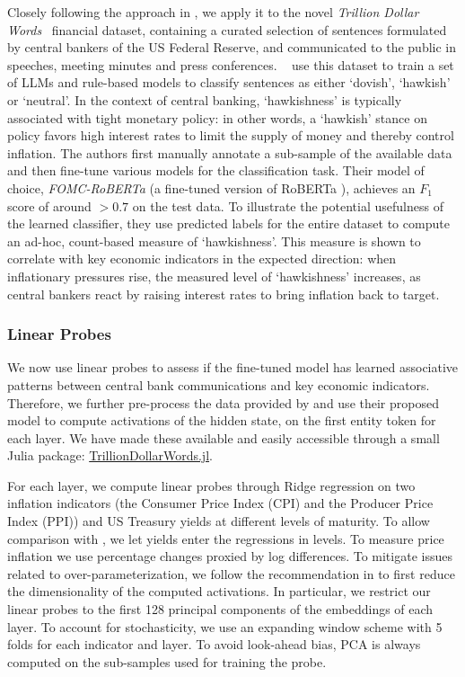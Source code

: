 \documentclass{article}
\theoremstyle{plain}
\theoremstyle{definition}
\theoremstyle{remark}
\begin{document}
Closely following the approach in \citet{gurnee2023languagev2}, we apply it to the novel \emph{Trillion Dollar Words}~\cite{shah2023trillion} financial dataset, containing a curated selection of sentences formulated by central bankers of the US Federal Reserve, and communicated to the public in speeches, meeting minutes and press conferences. ~\cite{shah2023trillion} use this dataset to train a set of LLMs and rule-based models to classify sentences as either `dovish', `hawkish' or `neutral'. In the context of central banking, `hawkishness' is typically associated with tight monetary policy: in other words, a `hawkish' stance on policy favors high interest rates to limit the supply of money and thereby control inflation. The authors first manually annotate a sub-sample of the available data and then fine-tune various models for the classification task. Their model of choice, \emph{FOMC-RoBERTa} (a fine-tuned version of RoBERTa \citep{liu2019roberta}), achieves an \(F_1\) score of around \(>0.7\) on the test data. To illustrate the potential usefulness of the learned classifier, they use predicted labels for the entire dataset to compute an ad-hoc, count-based measure of `hawkishness'. This measure is shown to correlate with key economic indicators in the expected direction: when inflationary pressures rise, the measured level of `hawkishness' increases, as central bankers react by raising interest rates to bring inflation back to target.

\subsubsection{Linear Probes}\label{linear-probes}
We now use linear probes to assess if the fine-tuned model has learned associative patterns between central bank communications and key economic indicators. Therefore, we further pre-process the data provided by \citet{shah2023trillion} and use their proposed model to compute activations of the hidden state, on the first entity token for each layer. We have made these available and easily accessible through a small Julia package: \href{https://anonymous.4open.science/r/TrillionDollarWords/README.md}{TrillionDollarWords.jl}. 

For each layer, we compute linear probes through Ridge regression on two inflation indicators (the Consumer Price Index (CPI) and the Producer Price Index (PPI)) and US Treasury yields at different levels of maturity. To allow
comparison with \citet{shah2023trillion}, we let yields enter the regressions in levels. To measure price inflation we use percentage changes proxied by log differences. To mitigate issues related to over-parameterization, we follow the recommendation in \citet{alain2018understanding} to first reduce the dimensionality of the computed activations.%
In particular, we restrict our linear probes to the first 128 principal components of the embeddings of each layer.
To account for stochasticity, we use an expanding window scheme with 5 folds for each indicator and layer. To avoid look-ahead bias, PCA is always computed on the sub-samples used for training the probe. 
\end{document}
